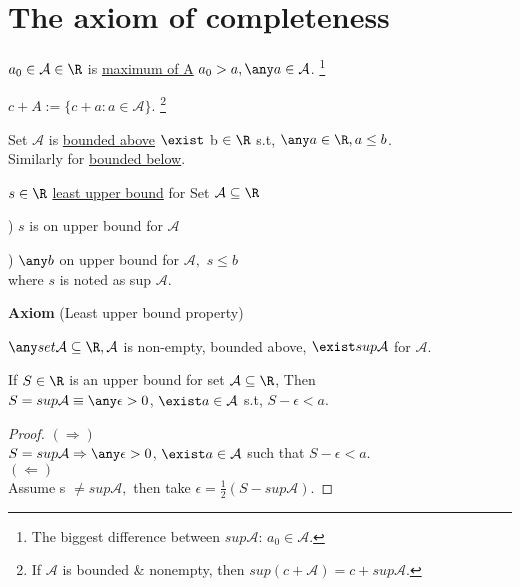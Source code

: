 \section{The axiom of completeness}
\begin{notation}
    \item $a_0 \in \mathcal{A} \in \R$ is \uline{maximum of A} \iff $a_0 > a, \any a \in \mathcal{A}$.
    \footnote{The biggest difference between $sup \mathcal{A}$: $a_0 \in \mathcal{A}$.}
    \item $c + A := \{ c+a : a\in \mathcal{A} \}$.
    \footnote{If $\mathcal{A}$ is bounded \& nonempty, then $sup (c+\mathcal{A}) = c + sup \mathcal{A}$.}
\end{notation}

\begin{definition}
    Set $\mathcal{A}$ is \uline{bounded above} \iff $\exist$ b $\in \R$ s.t, $\any a \in \R, a \leq b$.\\
    Similarly for \uline{bounded below}.
\end{definition}

\begin{definition}
    $s \in \R$ \uline{least upper bound} for Set $\mathcal{A} \subseteq \R$ \iff 

     ) $s$ is on upper bound for $\mathcal{A}$
        
     ) $\any b $ on upper bound for $\mathcal{A}, $ $s \leq b$\\
    where $s$ is noted as sup $\mathcal{A}$.
\end{definition}

\noindent \textbf{Axiom}  (Least upper bound property)

\indent $\any set \mathcal{A} \subseteq \R, \mathcal{A}$ is non-empty, bounded above, $\exist sup \mathcal{A} $ for $\mathcal{A}$.

\begin{lemma}
    If $S \in \R$ is an upper bound for set $\mathcal{A} \subseteq \R$, Then\\
    \indent $S = sup \mathcal{A} \equiv \any \epsilon > 0$, $\exist a \in \mathcal{A}$ s.t, $S - \epsilon < a$.
\end{lemma}
\begin{proof}
    $(\Rightarrow)$ \\
    $S = sup \mathcal{A} \Rightarrow \any \epsilon > 0$, $\exist a \in \mathcal{A}$ such that $S - \epsilon < a$.\\
    $(\Leftarrow)$ \\
    Assume s $\neq sup \mathcal{A}, $ then take $\epsilon = \frac{1}{2} (S - sup \mathcal{A})$.
\end{proof}

